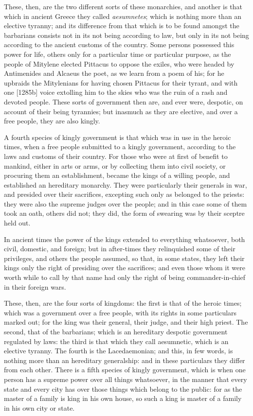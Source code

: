 These, then, are the two different sorts of these monarchies, and another
is that which in ancient Greece they called \emph{aesumnetes}; which is
nothing more than an elective tyranny; and its difference from that which
is to be found amongst the barbarians consists not in its not being
according to law, but only in its not being according to the ancient
customs of the country. Some persons possessed this power for life, others
only for a particular time or particular purpose, as the people of
Mitylene elected Pittacus to oppose the exiles, who were headed by
Antimenides and Alcaeus the poet, as we learn from a poem of his; for he
upbraids the Mitylenians for having chosen Pittacus for their tyrant, and
with one [1285b] voice extolling him to the skies who was the ruin of a
rash and devoted people. These sorts of government then are, and ever
were, despotic, on account of their being tyrannies; but inasmuch as they
are elective, and over a free people, they are also kingly.

A fourth species of kingly government is that which was in use in the
heroic times, when a free people submitted to a kingly government,
according to the laws and customs of their country. For those who were at
first of benefit to mankind, either in arts or arms, or by collecting them
into civil society, or procuring them an establishment, became the kings
of a willing people, and established an hereditary monarchy. They were
particularly their generals in war, and presided over their sacrifices,
excepting such only as belonged to the priests: they were also the supreme
judges over the people; and in this case some of them took an oath, others
did not; they did, the form of swearing was by their sceptre held out.

In ancient times the power of the kings extended to everything whatsoever,
both civil, domestic, and foreign; but in after-times they relinquished
some of their privileges, and others the people assumed, so that, in some
states, they left their kings only the right of presiding over the
sacrifices; and even those whom it were worth while to call by that name
had only the right of being commander-in-chief in their foreign wars.

These, then, are the four sorts of kingdoms: the first is that of the
heroic times; which was a government over a free people, with its rights
in some particulars marked out; for the king was their general, their
judge, and their high priest. The second, that of the barbarians; which is
an hereditary despotic government regulated by laws: the third is that
which they call aesumnetic, which is an elective tyranny. The fourth is
the Lacedaemonian; and this, in few words, is nothing more than an
hereditary generalship: and in these particulars they differ from each
other. There is a fifth species of kingly government, which is when one
person has a supreme power over all things whatsoever, in the manner that
every state and every city has over those things which belong to the
public: for as the master of a family is king in his own house, so such a
king is master of a family in his own city or state.

